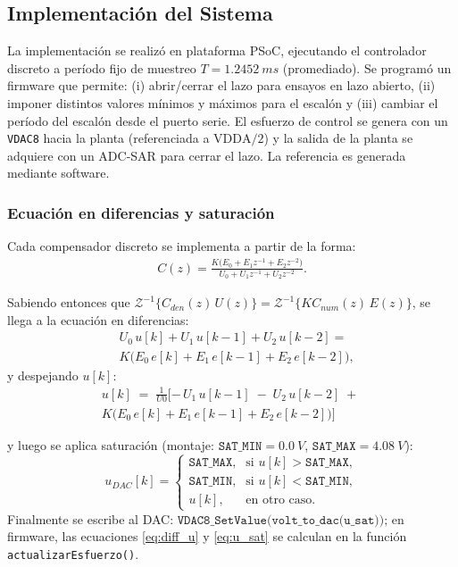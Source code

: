 \subsection{Implementación del Sistema}
La implementación se realizó en plataforma PSoC, ejecutando el controlador discreto a período fijo de muestreo \(T=\SI{1.2452}{ms}\) (promediado). Se programó un firmware que permite: (i) abrir/cerrar el lazo para ensayos en lazo abierto, (ii) imponer distintos valores mínimos y máximos para el escalón y (iii) cambiar el período del escalón desde el puerto serie. El esfuerzo de control se genera con un \texttt{VDAC8} hacia la planta (referenciada a \(\mathrm{VDDA}/2\)) y la salida de la planta se adquiere con un ADC-SAR para cerrar el lazo. La referencia es generada mediante software.

\subsubsection{Ecuación en diferencias y saturación}
Cada compensador discreto se implementa a partir de la forma:
\begin{equation}
	\label{eq:Cz_form}
	\begin{split}
		C(z)
		= \frac{K\big(E_0 + E_1 z^{-1} + E_2 z^{-2}\big)}
		{U_0 + U_1 z^{-1} + U_2 z^{-2}}.
	\end{split}
\end{equation}

Sabiendo entonces que \(\mathcal{Z}^{-1}\!\big\{C_{den}(z)\,U(z)\big\}=\mathcal{Z}^{-1}\!\big\{KC_{num}(z)\,E(z)\big\}\), se llega a la ecuación en diferencias:
\begin{equation}
	\label{eq:diff_balance}
	\begin{aligned}
		&U_0\,u[k] + U_1\,u[k-1] + U_2\,u[k-2]
		=\\
		 & K\Big(E_0\,e[k] + E_1\,e[k-1] + E_2\,e[k-2]\Big),
	\end{aligned}
\end{equation}
y despejando \(u[k]\):
\begin{equation}
	\label{eq:diff_u}
	\begin{split}
		u[k] \;=\;\frac{1}{U0}[
		-\,U_1\,u[k-1] \;-\; U_2\,u[k-2]
			\;+\; \\K\big(E_0\,e[k] + E_1\,e[k-1] + E_2\,e[k-2]\big)]
	\end{split}
\end{equation}


y luego se aplica saturación (montaje: \(\texttt{SAT\_MIN}=\SI{0.0}{V}\), \(\texttt{SAT\_MAX}=\SI{4.08}{V}\)):
\begin{equation}
	\label{eq:u_sat}
	u_{DAC}[k]=
	\begin{cases}
		\texttt{SAT\_MAX}, & \text{si } u[k]>\texttt{SAT\_MAX},\\
		\texttt{SAT\_MIN}, & \text{si } u[k]<\texttt{SAT\_MIN},\\
		u[k], & \text{en otro caso.}
	\end{cases}
\end{equation}
Finalmente se escribe al DAC: \(\texttt{VDAC8\_SetValue(volt\_to\_dac(u\_sat));}\)
en firmware, las ecuaciones \eqref{eq:diff_u} y \eqref{eq:u_sat} se calculan en la función \texttt{actualizarEsfuerzo()}.


